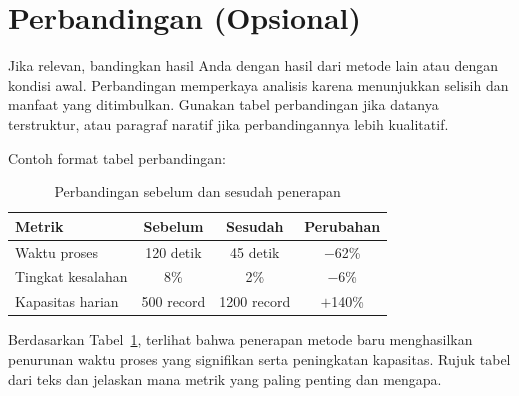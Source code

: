 \section{Perbandingan (Opsional)}
Jika relevan, bandingkan hasil Anda dengan hasil dari metode lain atau dengan kondisi awal. Perbandingan memperkaya analisis karena menunjukkan selisih dan manfaat yang ditimbulkan. Gunakan tabel perbandingan jika datanya terstruktur, atau paragraf naratif jika perbandingannya lebih kualitatif.

Contoh format tabel perbandingan:

\begin{table}[H]
    \centering
    \caption{Perbandingan sebelum dan sesudah penerapan}
    \label{tab:perbandingan}
    \begin{tabularx}{\textwidth}{| X | c | c | c |}
        \hline
        \textbf{Metrik} & \textbf{Sebelum} & \textbf{Sesudah} & \textbf{Perubahan} \\ \hline
        Waktu proses & 120 detik & 45 detik & $-$62\% \\ \hline
        Tingkat kesalahan & 8\% & 2\% & $-$6\% \\ \hline
        Kapasitas harian & 500 record & 1200 record & $+$140\% \\ \hline
    \end{tabularx}
\end{table}

Berdasarkan Tabel~\ref{tab:perbandingan}, terlihat bahwa penerapan metode baru menghasilkan penurunan waktu proses yang signifikan serta peningkatan kapasitas. Rujuk tabel dari teks dan jelaskan mana metrik yang paling penting dan mengapa.
